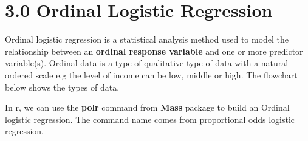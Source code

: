 \documentclass[
]{article}
\begin{document}
\newpage

\hypertarget{ordinal-logistic-regression}{%
\section{3.0 Ordinal Logistic
Regression}\label{ordinal-logistic-regression}}

Ordinal logistic regression is a statistical analysis method used to
model the relationship between an \textbf{ordinal response variable} and
one or more predictor variable(s). Ordinal data is a type of qualitative
type of data with a natural ordered scale e.g the level of income can be
low, middle or high. The flowchart below shows the types of data.

In r, we can use the \textbf{polr} command from \textbf{Mass} package to
build an Ordinal logistic regression. The command name comes from
proportional odds logistic regression.
\end{document}
